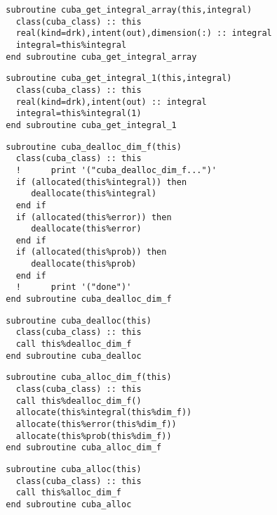 \begin{Verbatim}
  subroutine cuba_get_integral_array(this,integral)
    class(cuba_class) :: this
    real(kind=drk),intent(out),dimension(:) :: integral
    integral=this%integral
  end subroutine cuba_get_integral_array
\end{Verbatim}

\begin{Verbatim}
  subroutine cuba_get_integral_1(this,integral)
    class(cuba_class) :: this
    real(kind=drk),intent(out) :: integral
    integral=this%integral(1)
  end subroutine cuba_get_integral_1
\end{Verbatim}

\begin{Verbatim}
  subroutine cuba_dealloc_dim_f(this)
    class(cuba_class) :: this
    !      print '("cuba_dealloc_dim_f...")'
    if (allocated(this%integral)) then
       deallocate(this%integral)
    end if
    if (allocated(this%error)) then
       deallocate(this%error)
    end if
    if (allocated(this%prob)) then
       deallocate(this%prob)
    end if
    !      print '("done")'
  end subroutine cuba_dealloc_dim_f
\end{Verbatim}

\begin{Verbatim}
  subroutine cuba_dealloc(this)
    class(cuba_class) :: this
    call this%dealloc_dim_f
  end subroutine cuba_dealloc
\end{Verbatim}

\begin{Verbatim}
  subroutine cuba_alloc_dim_f(this)
    class(cuba_class) :: this
    call this%dealloc_dim_f()
    allocate(this%integral(this%dim_f))
    allocate(this%error(this%dim_f))
    allocate(this%prob(this%dim_f))
  end subroutine cuba_alloc_dim_f
\end{Verbatim}

\begin{Verbatim}
  subroutine cuba_alloc(this)
    class(cuba_class) :: this
    call this%alloc_dim_f
  end subroutine cuba_alloc
\end{Verbatim}

